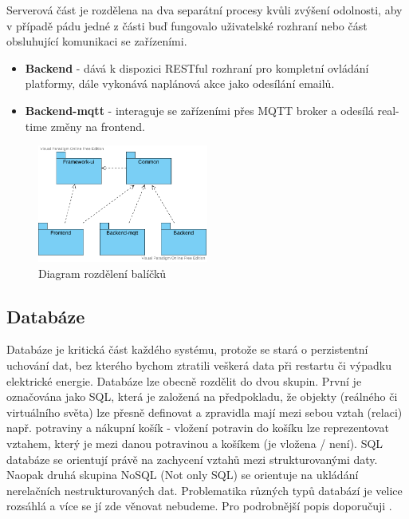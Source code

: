 Serverová část je rozdělena na dva separátní procesy kvůli zvýšení odolnosti, aby v případě pádu jedné z části buď fungovalo uživatelské rozhraní nebo část obsluhující komunikaci se zařízeními.
\begin{itemize}
    \item \textbf{Backend} - dává k dispozici RESTful rozhraní pro kompletní ovládání platformy, dále vykonává naplánová akce jako odesílání emailů.
    \item \textbf{Backend-mqtt} - interaguje se zařízeními přes MQTT broker a odesílá real-time změny na frontend.
\end{itemize}

\begin{figure}[htbp]
    \label{packages-uml}
    \centering
    \includegraphics[width=0.5\textwidth]{img/packages.pdf}
    \caption{Diagram rozdělení balíčků}
\end{figure}

\subsection{Databáze}
Databáze je kritická část každého systému, protože se stará o perzistentní uchování dat, bez kterého bychom ztratili veškerá data při restartu či výpadku elektrické energie. Databáze lze obecně rozdělit do dvou skupin. První je označována jako SQL, která je založená na předpokladu, že objekty (reálného či virtuálního světa) lze přesně definovat a zpravidla mají mezi sebou vztah (relaci) např. potraviny a nákupní košík - vložení potravin do košíku lze reprezentovat vztahem, který je mezi danou potravinou a košíkem (je vložena / není). SQL databáze se orientují právě na zachycení vztahů mezi strukturovanými daty. Naopak druhá skupina NoSQL (Not only SQL) se orientuje na ukládání nerelačních nestrukturovaných dat. Problematika různých typů databází je velice rozsáhlá a více se jí zde věnovat nebudeme. Pro podrobnější popis doporučuji \cite{sql-and-nosql}.

